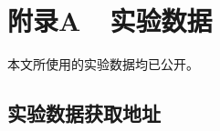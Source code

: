 



\chapter*{附录A~~实验数据}
本文所使用的实验数据均已公开。
\section*{实验数据获取地址}
\par

\renewcommand{\tablename}{附表}                                     %
\renewcommand{\thetable}{A-\arabic{table}}         %
